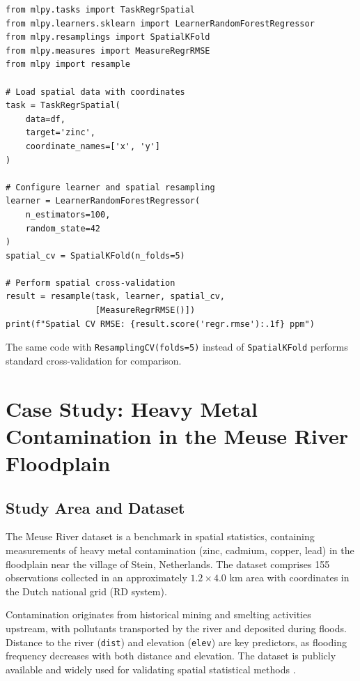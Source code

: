 \documentclass[a4paper,fleqn]{cas-sc}
\begin{document}
\begin{verbatim}
from mlpy.tasks import TaskRegrSpatial
from mlpy.learners.sklearn import LearnerRandomForestRegressor
from mlpy.resamplings import SpatialKFold
from mlpy.measures import MeasureRegrRMSE
from mlpy import resample

# Load spatial data with coordinates
task = TaskRegrSpatial(
    data=df,
    target='zinc',
    coordinate_names=['x', 'y']
)

# Configure learner and spatial resampling
learner = LearnerRandomForestRegressor(
    n_estimators=100,
    random_state=42
)
spatial_cv = SpatialKFold(n_folds=5)

# Perform spatial cross-validation
result = resample(task, learner, spatial_cv,
                  [MeasureRegrRMSE()])
print(f"Spatial CV RMSE: {result.score('regr.rmse'):.1f} ppm")
\end{verbatim}

The same code with \texttt{ResamplingCV(folds=5)} instead of \texttt{SpatialKFold} performs standard cross-validation for comparison.


\section{Case Study: Heavy Metal Contamination in the Meuse River Floodplain}
\label{sec:case-study}

\subsection{Study Area and Dataset}

The Meuse River dataset \citep{rikken1996geostatistics} is a benchmark in spatial statistics, containing measurements of heavy metal contamination (zinc, cadmium, copper, lead) in the floodplain near the village of Stein, Netherlands. The dataset comprises 155 observations collected in an approximately $1.2 \times 4.0$ km area with coordinates in the Dutch national grid (RD system).

Contamination originates from historical mining and smelting activities upstream, with pollutants transported by the river and deposited during floods. Distance to the river (\texttt{dist}) and elevation (\texttt{elev}) are key predictors, as flooding frequency decreases with both distance and elevation. The dataset is publicly available and widely used for validating spatial statistical methods \citep{pebesma2004multivariable}.
\end{document}
